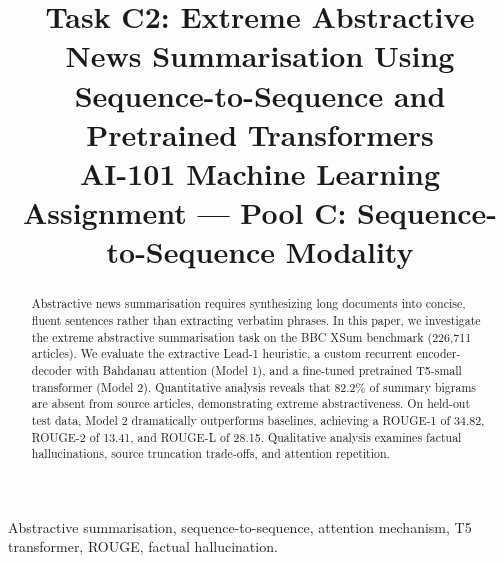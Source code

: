 \documentclass[conference]{IEEEtran}
\begin{document}
\title{Task C2: Extreme Abstractive News Summarisation Using Sequence-to-Sequence and Pretrained Transformers\\
\large AI-101 Machine Learning Assignment --- Pool C: Sequence-to-Sequence Modality}

\author{
\and
{}
}

\maketitle

\begin{abstract}
Abstractive news summarisation requires synthesizing long documents into concise, fluent sentences rather than extracting verbatim phrases. In this paper, we investigate the extreme abstractive summarisation task on the BBC XSum benchmark (226,711 articles). We evaluate the extractive Lead-1 heuristic, a custom recurrent encoder-decoder with Bahdanau attention (Model 1), and a fine-tuned pretrained T5-small transformer (Model 2). Quantitative analysis reveals that 82.2\% of summary bigrams are absent from source articles, demonstrating extreme abstractiveness. On held-out test data, Model 2 dramatically outperforms baselines, achieving a ROUGE-1 of 34.82, ROUGE-2 of 13.41, and ROUGE-L of 28.15. Qualitative analysis examines factual hallucinations, source truncation trade-offs, and attention repetition.
\end{abstract}

\begin{IEEEkeywords}
Abstractive summarisation, sequence-to-sequence, attention mechanism, T5 transformer, ROUGE, factual hallucination.
\end{IEEEkeywords}
\end{document}
